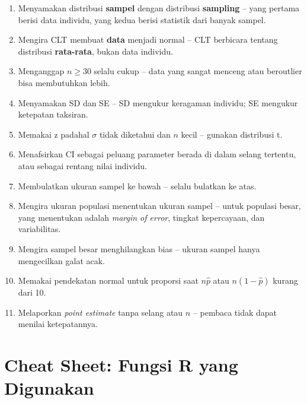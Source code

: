 \documentclass[
  indonesian,
  letterpaper,
]{book}
\providecommand{\tightlist}{%
  \setlength{\itemsep}{0pt}\setlength{\parskip}{0pt}}
\begin{document}
\begin{enumerate}
\def\labelenumi{\arabic{enumi}.}
\tightlist
\item
  Menyamakan distribusi \textbf{sampel} dengan distribusi
  \textbf{sampling} -- yang pertama berisi data individu, yang kedua
  berisi statistik dari banyak sampel.
\item
  Mengira CLT membuat \textbf{data} menjadi normal -- CLT berbicara
  tentang distribusi \textbf{rata-rata}, bukan data individu.
\item
  Menganggap \(n \ge 30\) selalu cukup -- data yang sangat menceng atau
  beroutlier bisa membutuhkan lebih.
\item
  Menyamakan SD dan SE -- SD mengukur keragaman individu; SE mengukur
  ketepatan taksiran.
\item
  Memakai z padahal \(\sigma\) tidak diketahui dan \(n\) kecil --
  gunakan distribusi t.
\item
  Menafsirkan CI sebagai peluang parameter berada di dalam selang
  tertentu, atau sebagai rentang nilai individu.
\item
  Membulatkan ukuran sampel ke bawah -- selalu bulatkan ke atas.
\item
  Mengira ukuran populasi menentukan ukuran sampel -- untuk populasi
  besar, yang menentukan adalah \emph{margin of error}, tingkat
  kepercayaan, dan variabilitas.
\item
  Mengira sampel besar menghilangkan bias -- ukuran sampel hanya
  mengecilkan galat acak.
\item
  Memakai pendekatan normal untuk proporsi saat \(n\hat{p}\) atau
  \(n(1-\hat{p})\) kurang dari 10.
\item
  Melaporkan \emph{point estimate} tanpa selang atau \(n\) -- pembaca
  tidak dapat menilai ketepatannya.
\end{enumerate}

\section{Cheat Sheet: Fungsi R yang
Digunakan}\label{cheat-sheet-fungsi-r-yang-digunakan}
\end{document}
